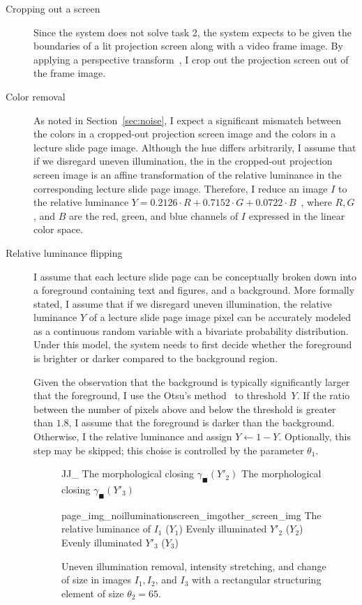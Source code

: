 \begin{description}
  \item[Cropping out a screen]
    Since the system does not solve task 2, the system expects to be given the
    boundaries of a lit projection screen along with a video frame image. By
    applying a perspective transform~\cite[sec.~2]{eberly11}, I crop out the
    projection screen out of the frame image.
  \item[Color removal]
    As noted in Section~\ref{sec:noise}, I expect a significant mismatch
    between the colors in a cropped-out projection screen image and the colors
    in a lecture slide page image. Although the hue differs arbitrarily, I
    assume that if we disregard uneven illumination, the  in the cropped-out projection screen image is an affine
    transformation of the relative luminance in the corresponding lecture slide
    page image. Therefore, I reduce an image $I$ to the relative luminance
    $Y=0.2126\cdot R+0.7152\cdot G+0.0722\cdot B$~\cite[part~2]{stokesetal96},
    where $R,G$, and $B$ are the red, green, and blue channels of $I$ expressed
    in the linear  color space.
  \item[Relative luminance flipping]
    I assume that each lecture slide page can be conceptually broken down into
    a foreground containing text and figures, and a background.
    More formally stated, I assume that if we disregard uneven illumination,
    the relative luminance $Y$ of a lecture slide page image pixel can be
    accurately modeled as a continuous random variable with a bivariate
    probability distribution. Under this model, the system needs to first
    decide whether the foreground is brighter or darker compared to the
    background region.
    
    Given the observation that the background is typically significantly
    larger that the foreground, I use the Otsu's
    method~\cite{otsu1979threshold} to threshold~$Y$. If the ratio between the
    number of pixels above and below the threshold is greater than $1.8$, I
    assume that the foreground is darker than the background. Otherwise, I
     the relative luminance and assign $Y\leftarrow1-Y$.
    Optionally, this step may be skipped; this choise is controlled by the
    parameter $\theta_1$.

  \begin{figure}
      {J}{J_}%
      {The morphological closing $\gamma_\blacksquare(Y'_2)$}%
      {The morphological closing $\gamma_\blacksquare(Y'_3)$}\par
      {page_img_noillumination}{screen_img}{other_screen_img}%
      {The relative luminance of $I_1$ ($Y_1$)}%
      {Evenly illuminated $Y'_2$ ($Y_2$)}%
      {Evenly illuminated $Y'_3$ ($Y_3$)}
    \caption{Uneven illumination removal, intensity stretching, and change of
      size in images $I_1,I_2$, and $I_3$ with a rectangular structuring
      element of size $\theta_2 = 65$.}


\end{figure}
\end{description}
